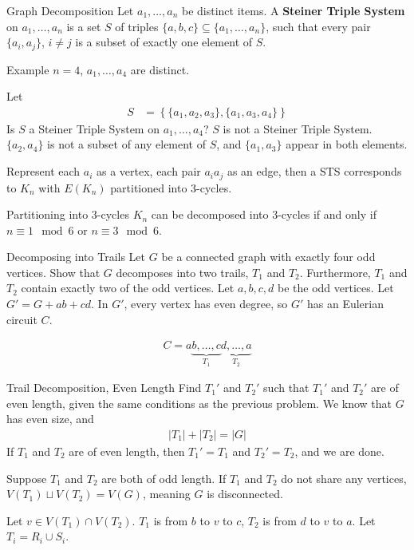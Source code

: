 \documentclass[10pt]{extarticle}
\begin{document}
  \begin{problem}{Graph Decomposition}
    Let $a_1,\dots,a_n$ be distinct items. A \textbf{Steiner Triple System} on $a_1,\dots,a_n$ is a set $S$ of triples $\{a,b,c\} \subseteq \{a_1,\dots,a_n\}$, such that every pair $\{a_i,a_j\}$, $i\neq j$ is a subset of exactly one element of $S$.\newline

    \begin{problem}{Example}
      $n=4$, $a_1,\dots,a_4$ are distinct.\newline

      Let
      \begin{align*}
        S &= \left\{\{a_1,a_2,a_3\},\{a_1,a_3,a_4\}\right\}
      \end{align*}
      Is $S$ a Steiner Triple System on $a_1,\dots,a_4$?
      \tcblower
      $S$ is not a Steiner Triple System. $\{a_2,a_4\}$ is not a subset of any element of $S$, and $\{a_1,a_3\}$ appear in both elements.
    \end{problem}
    Represent each $a_i$ as a vertex, each pair $a_ia_j$ as an edge, then a STS corresponds to $K_n$ with $E(K_n)$ partitioned into $3$-cycles.
    \begin{problem}{Partitioning into $3$-cycles}
      $K_n$ can be decomposed into $3$-cycles if and only if $n \equiv 1\mod 6$ or $n \equiv 3\mod 6$.
    \end{problem}
  \end{problem}
  \begin{problem}{Decomposing into Trails}
    Let $G$ be a connected graph with exactly four odd vertices. Show that $G$ decomposes into two trails, $T_1$ and $T_2$. Furthermore, $T_1$ and $T_2$ contain exactly two of the odd vertices.
    \tcblower
    Let $a,b,c,d$ be the odd vertices. Let $G' = G + ab + cd$. In $G'$, every vertex has even degree, so $G'$ has an Eulerian circuit $C$.\newline

    \begin{align*}
      C = a\underbrace{b,\dots,c}_{T_1}\underbrace{d,\dots,a}_{T_2}
    \end{align*}
  \end{problem}
  \begin{problem}{Trail Decomposition, Even Length}
    Find $T_1'$ and $T_2'$ such that $T_1'$ and $T_2'$ are of even length, given the same conditions as the previous problem.
    \tcblower
    We know that $G$ has even size, and
    \begin{align*}
      |T_1| + |T_2| = |G|
    \end{align*}
    If $T_1$ and $T_2$ are of even length, then $T_1' = T_1$ and $T_2' = T_2$, and we are done.\newline

    Suppose $T_1$ and $T_2$ are both of odd length. If $T_1$ and $T_2$ do not share any vertices, $V(T_1) \sqcup V(T_2) = V(G)$, meaning $G$ is disconnected.\newline

    Let $v \in V(T_1) \cap V(T_2)$. $T_1$ is from $b$ to $v$ to $c$, $T_2$ is from $d$ to $v$ to $a$. Let $T_i = R_i \cup S_i$. 
  \end{problem}
\end{document}
